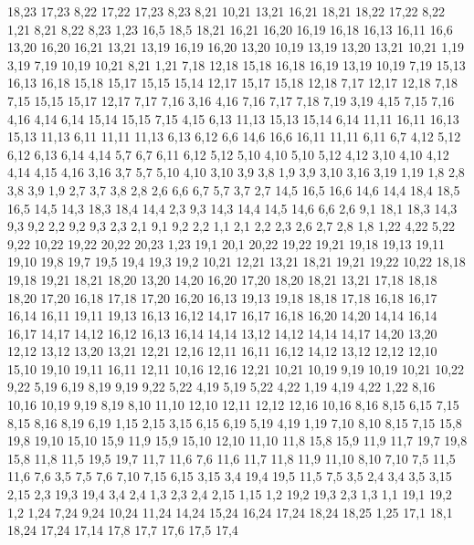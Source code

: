18,23
17,23
%
8,22
17,22
17,23
8,23
%
8,21
10,21
13,21
16,21
18,21
18,22
17,22
8,22
%
1,21
8,21
8,22
8,23
1,23
%
16,5
18,5
18,21
16,21
16,20
16,19
16,18
16,13
16,11
16,6
%
13,20
16,20
16,21
13,21
%
13,19
16,19
16,20
13,20
%
10,19
13,19
13,20
13,21
10,21
%
1,19
3,19
7,19
10,19
10,21
8,21
1,21
%
7,18
12,18
15,18
16,18
16,19
13,19
10,19
7,19
%
15,13
16,13
16,18
15,18
15,17
15,15
15,14
%
12,17
15,17
15,18
12,18
%
7,17
12,17
12,18
7,18
%
7,15
15,15
15,17
12,17
7,17
7,16
%
3,16
4,16
7,16
7,17
7,18
7,19
3,19
%
4,15
7,15
7,16
4,16
%
4,14
6,14
15,14
15,15
7,15
4,15
%
6,13
11,13
15,13
15,14
6,14
%
11,11
16,11
16,13
15,13
11,13
%
6,11
11,11
11,13
6,13
6,12
%
6,6
14,6
16,6
16,11
11,11
6,11
6,7
%
4,12
5,12
6,12
6,13
6,14
4,14
%
5,7
6,7
6,11
6,12
5,12
5,10
%
4,10
5,10
5,12
4,12
%
3,10
4,10
4,12
4,14
4,15
4,16
3,16
%
3,7
5,7
5,10
4,10
3,10
3,9
3,8
%
1,9
3,9
3,10
3,16
3,19
1,19
%
1,8
2,8
3,8
3,9
1,9
%
2,7
3,7
3,8
2,8
%
2,6
6,6
6,7
5,7
3,7
2,7
%
14,5
16,5
16,6
14,6
%
14,4
18,4
18,5
16,5
14,5
%
14,3
18,3
18,4
14,4
%
2,3
9,3
14,3
14,4
14,5
14,6
6,6
2,6
%
9,1
18,1
18,3
14,3
9,3
9,2
%
2,2
9,2
9,3
2,3
%
2,1
9,1
9,2
2,2
%
1,1
2,1
2,2
2,3
2,6
2,7
2,8
1,8
1,22
4,22
5,22
9,22
10,22
19,22
20,22
20,23
1,23
%
19,1
20,1
20,22
19,22
19,21
19,18
19,13
19,11
19,10
19,8
19,7
19,5
19,4
19,3
19,2
%
10,21
12,21
13,21
18,21
19,21
19,22
10,22
%
18,18
19,18
19,21
18,21
18,20
%
13,20
14,20
16,20
17,20
18,20
18,21
13,21
%
17,18
18,18
18,20
17,20
%
16,18
17,18
17,20
16,20
%
16,13
19,13
19,18
18,18
17,18
16,18
16,17
16,14
%
16,11
19,11
19,13
16,13
16,12
%
14,17
16,17
16,18
16,20
14,20
%
14,14
16,14
16,17
14,17
%
14,12
16,12
16,13
16,14
14,14
%
13,12
14,12
14,14
14,17
14,20
13,20
%
12,12
13,12
13,20
13,21
12,21
12,16
%
12,11
16,11
16,12
14,12
13,12
12,12
%
12,10
15,10
19,10
19,11
16,11
12,11
%
10,16
12,16
12,21
10,21
10,19
%
9,19
10,19
10,21
10,22
9,22
%
5,19
6,19
8,19
9,19
9,22
5,22
%
4,19
5,19
5,22
4,22
%
1,19
4,19
4,22
1,22
%
8,16
10,16
10,19
9,19
8,19
%
8,10
11,10
12,10
12,11
12,12
12,16
10,16
8,16
8,15
%
6,15
7,15
8,15
8,16
8,19
6,19
%
1,15
2,15
3,15
6,15
6,19
5,19
4,19
1,19
%
7,10
8,10
8,15
7,15
%
15,8
19,8
19,10
15,10
15,9
%
11,9
15,9
15,10
12,10
11,10
%
11,8
15,8
15,9
11,9
%
11,7
19,7
19,8
15,8
11,8
%
11,5
19,5
19,7
11,7
11,6
%
7,6
11,6
11,7
11,8
11,9
11,10
8,10
7,10
%
7,5
11,5
11,6
7,6
%
3,5
7,5
7,6
7,10
7,15
6,15
3,15
%
3,4
19,4
19,5
11,5
7,5
3,5
%
2,4
3,4
3,5
3,15
2,15
%
2,3
19,3
19,4
3,4
2,4
%
1,3
2,3
2,4
2,15
1,15
%
1,2
19,2
19,3
2,3
1,3
%
1,1
19,1
19,2
1,2
1,24
7,24
9,24
10,24
11,24
14,24
15,24
16,24
17,24
18,24
18,25
1,25
%
17,1
18,1
18,24
17,24
17,14
17,8
17,7
17,6
17,5
17,4
